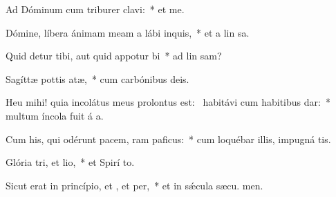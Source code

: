 \item Ad Dóminum cum triburer clavi:~* et  me.
\item Dómine, líbera ánimam meam a lábi inquis,~* et a lin sa.
\item Quid detur tibi, aut quid appotur bi~* ad lin sam?
\item Sagíttæ pottis atæ,~* cum carbónibus deis.
\item Heu mihi! quia incolátus meus prolontus est:~\pscross{} habitávi cum habitibus dar:~* multum íncola fuit á a.
\item Cum his, qui odérunt pacem, ram paficus:~* cum loquébar illis, impugná  tis.
\item Glória tri, et lio,~* et Spirí to.
\item Sicut erat in princípio, et , et per,~* et in sǽcula sæcu. men.
